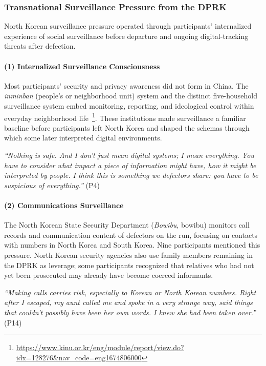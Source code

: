 \documentclass[conference,compsoc]{IEEEtran}
\begin{document}
\subsubsection{Transnational Surveillance Pressure from the DPRK}
\label{subsubsec:dprk-pressure}

North Korean surveillance pressure operated through participants' internalized experience of social surveillance before departure and ongoing digital-tracking threats after defection.

\paragraph{\textbf{(1) Internalized Surveillance Consciousness}}
Most participants' security and privacy awareness did not form in China. The \emph{inminban} (people's or neighborhood unit) system and the distinct five-household surveillance system embed monitoring, reporting, and ideological control within everyday neighborhood life~\footnote{\url{https://www.kinu.or.kr/eng/module/report/view.do?idx=128276&nav_code=eng1674806000}}. These institutions made surveillance a familiar baseline before participants left North Korea and shaped the schemas through which some later interpreted digital environments.

\begin{displayquote}
\textit{``Nothing is safe. And I don't just mean digital systems; I mean everything. You have to consider what impact a piece of information might have, how it might be interpreted by people. I think this is something we defectors share: you have to be suspicious of everything.''} (P4)
\end{displayquote}

\paragraph{\textbf{(2) Communications Surveillance}}
The North Korean State Security Department (\emph{Bowibu}, bowibu) monitors call records and communication content of defectors on the run, focusing on contacts with numbers in North Korea and South Korea. Nine participants mentioned this pressure. North Korean security agencies also use family members remaining in the DPRK as leverage; some participants recognized that relatives who had not yet been prosecuted may already have become coerced informants.

\begin{displayquote}
\textit{``Making calls carries risk, especially to Korean or North Korean numbers. Right after I escaped, my aunt called me and spoke in a very strange way, said things that couldn't possibly have been her own words. I knew she had been taken over.''} (P14)
\end{displayquote}
\end{document}
